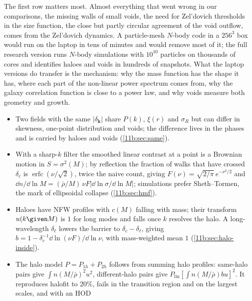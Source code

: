 The first row matters most. Almost everything that went wrong in our comparisons, the missing walls of small voids, the need for Zel'dovich
thresholds in the size function, the close but partly circular agreement of
the void outflow, comes from the Zel'dovich dynamics. A particle-mesh $N$-body code
in a $256^3$ box would run on the laptop in tens of minutes and would remove most of
it; the full research version runs $N$-body simulations with $10^{10}$ particles on
thousands of cores and identifies haloes and voids in hundreds of snapshots. What
the laptop versions do transfer is the mechanism: why the mass function has the
shape it has, where each part of the non-linear power spectrum comes from, why the
galaxy correlation function is close to a power law, and why voids measure both
geometry and growth.

\begin{recap}
\begin{itemize}[leftmargin=1.2em,itemsep=2pt]
  \item Two fields with the same $|\delta_{\bm k}|$ share $P(k)$, $\xi(r)$ and
        $\sigma_R$ but can differ in skewness, one-point distribution and voids;
        the difference lives in the phases and is carried by haloes and voids
        (\cref{11b:sec:same}).
  \item With a sharp-$k$ filter the smoothed linear contrast at a point is a
        Brownian motion in $S=\sigma^2(M)$; by reflection the fraction of walks
        that have crossed $\delta_c$ is $\operatorname{erfc}(\nu/\sqrt2)$, twice the
        naive count, giving $F(\nu)=\sqrt{2/\pi}\,e^{-\nu^2/2}$ and
        $\dd n/\dd\ln M=(\bar\rho/M)\,\nu F|\dd\ln\sigma/\dd\ln M|$; simulations prefer
        Sheth--Tormen, the mark of ellipsoidal collapse (\cref{11b:sec:hmf}).
  \item Haloes have NFW profiles with $c(M)$ falling with mass; their transform
        $u(k\given M)$ is $1$ for long modes and falls once $k$ resolves the halo.
        A long-wavelength $\delta_\ell$ lowers the barrier to
        $\delta_c-\delta_\ell$, giving $b=1-\delta_c^{-1}\dd\ln(\nu F)/\dd\ln\nu$, with
        mass-weighted mean $1$ (\cref{11b:sec:halo-inside}).
  \item The halo model $P=P_{1h}+P_{2h}$ follows from summing halo profiles:
        same-halo pairs give $\int n(M/\bar\rho)^2u^2$, different-halo pairs give
        $P_{\mathrm{lin}}[\int n(M/\bar\rho)bu]^2$. It reproduces halofit to $20\%$,
        fails in the transition region and on the largest scales, and with an HOD

\end{itemize}
\end{recap}
